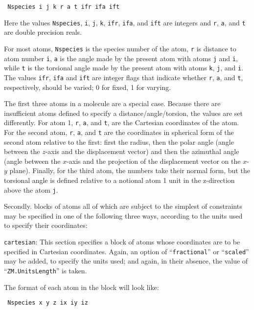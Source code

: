 \documentclass[11pt]{article}
\begin{document}
\begin{description}
\noindent\texttt{    Nspecies i j k r a t ifr ifa ift}

Here the values \texttt{Nspecies}, \texttt{i}, \texttt{j}, \texttt{k},
\texttt{ifr}, \texttt{ifa}, and \texttt{ift} are integers and
\texttt{r}, \texttt{a}, and \texttt{t} are double precision reals.

For most atoms, \texttt{Nspecies} is the species number of the atom,
\texttt{r} is distance to atom number \texttt{i}, \texttt{a} is the
angle made by the present atom with atoms \texttt{j} and \texttt{i},
while \texttt{t} is the torsional angle made by the present atom with
atoms \texttt{k}, \texttt{j}, and \texttt{i}. The values \texttt{ifr},
\texttt{ifa} and \texttt{ift} are integer flags that indicate whether
\texttt{r}, \texttt{a}, and \texttt{t}, respectively, should be
varied; 0 for fixed, 1 for varying.


The first three atoms in a molecule are a special case. Because there
are insufficient atoms defined to specify a distance/angle/torsion,
the values are set differently. For atom 1, \texttt{r}, \texttt{a},
and \texttt{t}, are the Cartesian coordinates of the atom.  For the
second atom, \texttt{r}, \texttt{a}, and \texttt{t} are the
coordinates in spherical form of the second atom relative to the
first: first the radius, then the polar angle (angle between the
$z$-axis and the displacement vector) and then the azimuthal angle
(angle between the $x$-axis and the projection of the displacement
vector on the $x$-$y$ plane). Finally, for the third atom, the numbers
take their normal form, but the torsional angle is defined relative to
a notional atom 1 unit in the z-direction above the atom \texttt{j}.

Secondly. blocks of atoms all of which are subject to the simplest of
constraints may be specified in one of the following three ways,
according to the units used to specify their coordinates:


\item \texttt{cartesian}: This section specifies a block of atoms
whose coordinates are to be specified in Cartesian coordinates. Again,
an option of ``\texttt{fractional}'' or ``\texttt{scaled}'' may be
added, to specify the units used; and again, in their absence, the
value of ``\texttt{ZM.UnitsLength}'' is taken.

The format of each atom in the block will look like:

\noindent\texttt{      Nspecies x y z ix iy iz}


\end{description}
\end{document}
